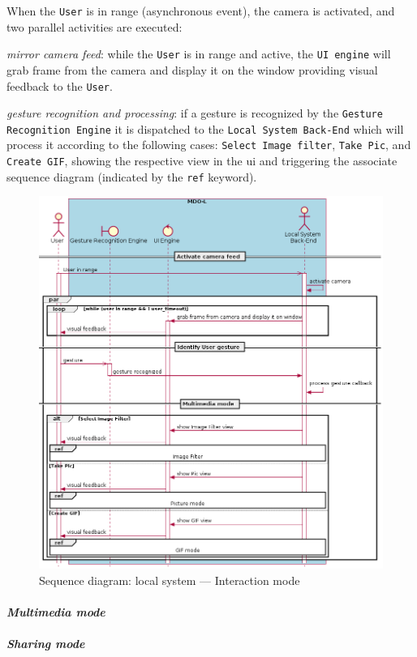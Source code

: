 When the \texttt{User} is in range (asynchronous event), the camera is
activated, and two parallel activities are executed:
\begin{item-c}
\item \emph{mirror camera feed}: while the \texttt{User} is in range and
active, the \texttt{UI engine} will grab frame from the camera and display it on
the window providing visual feedback to the \texttt{User}.
\item \emph{gesture recognition and processing}: if a gesture is recognized by
  the \texttt{Gesture Recognition Engine} it is dispatched to the \texttt{Local
    System Back-End} which will process it according to the following cases:
  \texttt{Select Image filter}, \texttt{Take Pic}, and \texttt{Create GIF},
  showing the respective view in the \gls{ui} and triggering the associate
  sequence diagram (indicated by the \texttt{ref} keyword).
\end{item-c}
%
\begin{figure}[htb!]
  \centering
  \includegraphics[width=0.8\columnwidth]{./img/seq-local-interaction-mode.png}
  \caption{Sequence diagram: local system --- Interaction mode}%
\label{fig:seq-local-interaction-mode}
\end{figure}
%

\paragraph{\emph{Multimedia mode}}
\paragraph{\emph{Sharing mode}}